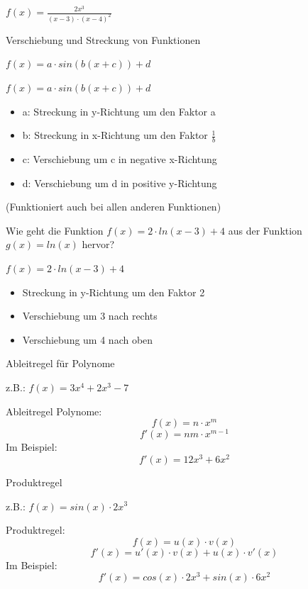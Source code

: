 \documentclass[paper=a6,landscape,ngerman,twoside=true,fontsize=12pt]{scrartcl}
\begin{document}
\begin{antwort}
	\LARGE $f(x)=\frac{ 2x^3}{(x-3) \cdot (x-4)^2}$
\end{antwort}
\begin{frage}
	Verschiebung und Streckung von Funktionen  \bigskip
	
	$f(x)=a \cdot sin(b(x+c))+d$
\end{frage}
\begin{antwort}
	$f(x)=a \cdot sin(b(x+c))+d$
	\begin{itemize}
		\item a: Streckung in y-Richtung um den Faktor a
		\item b: Streckung in x-Richtung um den Faktor $\frac{1}{b}$
		\item c: Verschiebung um c in negative x-Richtung
		\item d: Verschiebung um d in positive y-Richtung
							
	\end{itemize}
	
	(Funktioniert auch bei allen anderen Funktionen)
\end{antwort}
\begin{frage}
	Wie geht die Funktion $f(x)=2 \cdot ln(x-3)+4$ aus der 
	Funktion $g(x)=ln(x)$ hervor?
\end{frage}
\begin{antwort}
	$f(x)=2 \cdot ln(x-3)+4$
	\begin{itemize}
		\item Streckung in y-Richtung um den Faktor 2		
		\item Verschiebung um 3 nach rechts
		\item Verschiebung um 4 nach oben							
	\end{itemize}	
\end{antwort}
\begin{frage}
	Ableitregel für Polynome
	
	z.B.: $f(x)=3x^4+2x^3-7$
	
\end{frage}
\begin{antwort}
	Ableitregel Polynome:
	\[
	f(x) = n \cdot x^m
	\]
	\[	
	f'(x)= nm \cdot x^{m-1}
	\]
	Im Beispiel:
	\[
	f'(x)=12x^3+6x^2
	\]
\end{antwort}
\begin{frage}
	Produktregel
	
	z.B.: $f(x)=sin(x)\cdot2x^3$
	
\end{frage}
\begin{antwort}
	Produktregel:
	\[
	f(x) = u(x)\cdot v(x)
	\]
	\[
	f'(x)=u'(x)\cdot v(x)+u(x)\cdot v'(x)
	\]
	Im Beispiel:
	\[
	f'(x)=cos(x)\cdot 2x^3 + sin(x)\cdot 6x^2
	\]
\end{antwort}
\end{document}
